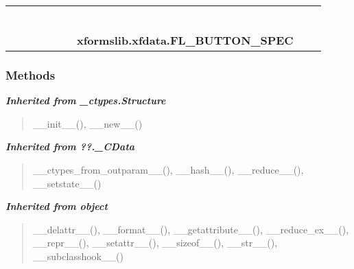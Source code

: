     \label{xformslib:xfdata:FL_BUTTON_SPEC}
\begin{tabular}{cccccccccc}
\multicolumn{2}{r}{\settowidth{\BCL}{object}\multirow{2}{\BCL}{object}}
&&
&&
&&
  \\\cline{3-3}
  &&\multicolumn{1}{c|}{}
&&
&&
&&
  \\
\multicolumn{4}{r}{\settowidth{\BCL}{??.\_CData}\multirow{2}{\BCL}{??.\_CData}}
&&
&&
  \\\cline{5-5}
  &&&&\multicolumn{1}{c|}{}
&&
&&
  \\
\multicolumn{6}{r}{\settowidth{\BCL}{\_ctypes.Structure}\multirow{2}{\BCL}{\_ctypes.Structure}}
&&
  \\\cline{7-7}
  &&&&&&\multicolumn{1}{c|}{}
&&
  \\
&&&&&&\multicolumn{2}{l}{\textbf{xformslib.xfdata.FL\_BUTTON\_SPEC}}
\end{tabular}



  \subsubsection{Methods}


\large{\textbf{\textit{Inherited from \_ctypes.Structure}}}

\begin{quote}
\_\_init\_\_(), \_\_new\_\_()
\end{quote}

\large{\textbf{\textit{Inherited from ??.\_CData}}}

\begin{quote}
\_\_ctypes\_from\_outparam\_\_(), \_\_hash\_\_(), \_\_reduce\_\_(), \_\_setstate\_\_()
\end{quote}

\large{\textbf{\textit{Inherited from object}}}

\begin{quote}
\_\_delattr\_\_(), \_\_format\_\_(), \_\_getattribute\_\_(), \_\_reduce\_ex\_\_(), \_\_repr\_\_(), \_\_setattr\_\_(), \_\_sizeof\_\_(), \_\_str\_\_(), \_\_subclasshook\_\_()
\end{quote}

